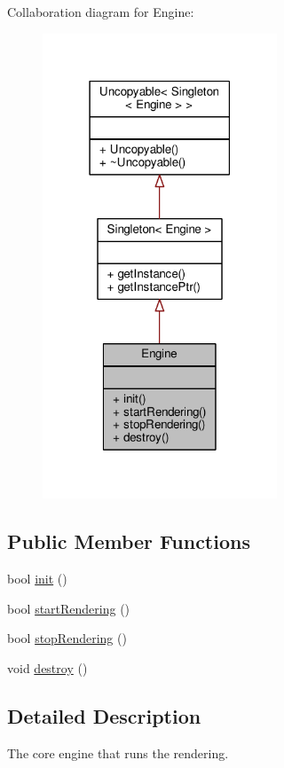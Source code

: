 Collaboration diagram for Engine\-:
\nopagebreak
\begin{figure}[H]
\begin{center}
\leavevmode
\includegraphics[width=198pt]{classEngine__coll__graph}
\end{center}
\end{figure}
\subsection*{Public Member Functions}
\begin{DoxyCompactItemize}
\item 
bool \hyperlink{classEngine_a89c3790af9e7b75e6b220bfe05244bde}{init} ()
\item 
bool \hyperlink{classEngine_a350d1f9f0ddd624dc8d350b68e894507}{start\-Rendering} ()
\item 
bool \hyperlink{classEngine_ab3926379b2c80b7228465650b7597542}{stop\-Rendering} ()
\item 
void \hyperlink{classEngine_a35096815432e2ce39f8e2ebaf6cf4b05}{destroy} ()
\end{DoxyCompactItemize}


\subsection{Detailed Description}
The core engine that runs the rendering.

